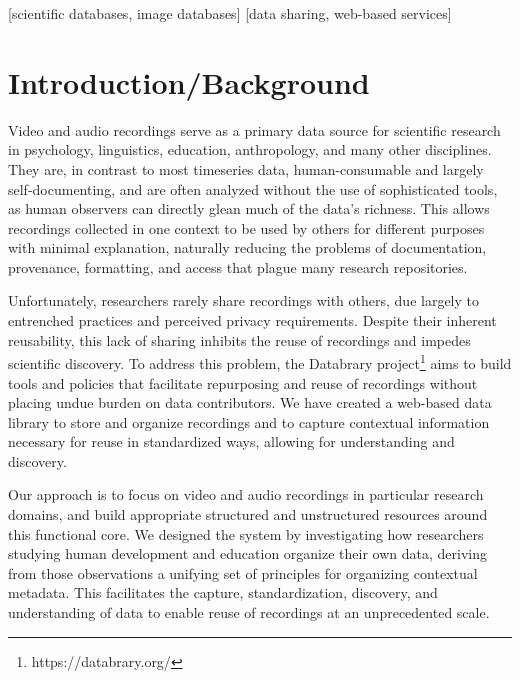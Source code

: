\documentclass{sig-alternate}
\begin{document}
[scientific databases, image databases]
[data sharing, web-based services]



\section{Introduction/Background}

Video and audio recordings serve as a primary data source for scientific research in psychology, linguistics, education, anthropology, and many other disciplines.
They are, in contrast to most timeseries data, human-consumable and largely self-documenting, and are often analyzed without the use of sophisticated tools, as human observers can directly glean much of the data's richness.
This allows recordings collected in one context to be used by others for different purposes with minimal explanation, naturally reducing the problems of documentation, provenance, formatting, and access that plague many research repositories.

Unfortunately, researchers rarely share recordings with others, due largely to entrenched practices and perceived privacy requirements.
Despite their inherent reusability, this lack of sharing inhibits the reuse of recordings and impedes scientific discovery.
To address this problem, the Databrary project\footnote{https://databrary.org/} aims to build tools and policies that facilitate repurposing and reuse of recordings without placing undue burden on data contributors.
We have created a web-based data library to store and organize recordings and to capture contextual information necessary for reuse in standardized ways, allowing for understanding and discovery.

Our approach is to focus on video and audio recordings in particular research domains, and build appropriate structured and unstructured resources around this functional core.
We designed the system by investigating how researchers studying human development and education organize their own data, deriving from those observations a unifying set of principles for organizing contextual metadata.
This facilitates the capture, standardization, discovery, and understanding of data to enable reuse of recordings at an unprecedented scale.
\end{document}
